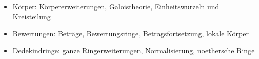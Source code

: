 \begin{module}
\begin{content}
\begin{itemize}\item Körper: \newline
Körpererweiterungen, Galoistheorie, Einheitswurzeln und Kreisteilung  \item Bewertungen: \newline
Beträge, Bewertungsringe, Betragsfortsetzung, lokale Körper  \item Dedekindringe: \newline
ganze Ringerweiterungen, Normalisierung, noethersche Ringe  \end{itemize}
\end{content}



\end{module}

